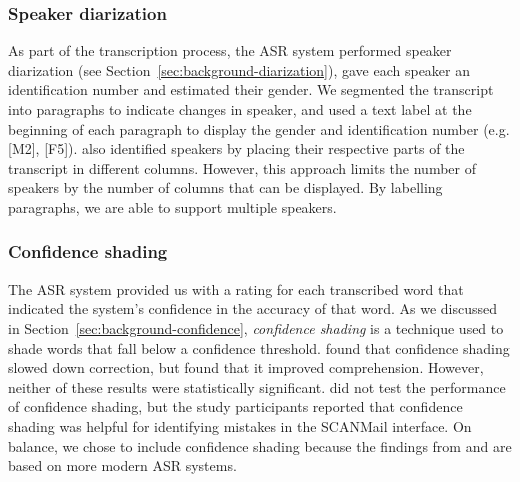 \subsubsection{Speaker diarization}

As part of the transcription process, the ASR system performed speaker diarization (see
Section~\ref{sec:background-diarization}), gave each speaker an identification number and estimated their gender.  We
segmented the transcript into paragraphs to indicate changes in speaker, and used a text label at the beginning of each
paragraph to display the gender and identification number (e.g.  [M2], [F5]).  \citet{Rubin2013} also identified
speakers by placing their respective parts of the transcript in different columns.  However, this approach limits the
number of speakers by the number of columns that can be displayed. By labelling paragraphs, we are able to support
multiple speakers.

\subsubsection{Confidence shading}
The ASR system provided us with a rating for each transcribed word that indicated the system's confidence in the
accuracy of that word.  As we discussed in Section~\ref{sec:background-confidence}, \textit{confidence shading} is a
technique used to shade words that fall below a confidence threshold.  \citet{Suhm2001} found that confidence shading
slowed down correction, but \citet{Vemuri2004} found that it improved comprehension. However, neither of these results
were statistically significant.  \citet{Burke2006} did not test the performance of confidence shading, but the study
participants reported that confidence shading was helpful for identifying mistakes in the SCANMail interface.  On
balance, we chose to include confidence shading because the findings from \citet{Vemuri2004} and \citet{Burke2006} are
based on more modern ASR systems.


